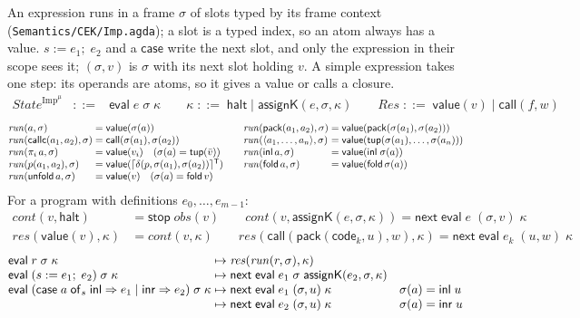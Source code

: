 \documentclass[10pt]{article}
\theoremstyle{acmplain}
\newcommand{\key}[1]{\mathsf{#1}}
\newcommand{\inl}{\key{inl}\,}
\newcommand{\tuple}[1]{\langle #1 \rangle}
\newcommand{\prj}[1]{\pi_{#1}\,}
\newcommand{\prim}[3]{#1(#2, #3)}
\newcommand{\nxt}{\key{next}\;}
\newcommand{\stp}{\key{stop}\;}
\newcommand{\obs}{\mathit{obs}}
\newcommand{\tupV}[1]{\key{tup}(#1)}
\newcommand{\codeV}[1]{\key{code}_{#1}}
\newcommand{\inlV}{\key{inl}\;}
\newcommand{\inrV}{\key{inr}\;}
\newcommand{\Kf}[2]{\key{#1}(#2)}
\newcommand{\halt}{\key{halt}}
\newcommand{\assign}[3]{#1 \mathrel{:=} #2;\; #3}
\newcommand{\Casei}[4]{\key{case}\;#1\;\key{of}_{#2}\;\key{inl} \Rightarrow #3 \mid \key{inr} \Rightarrow #4}
\newcommand{\evi}[3]{\key{eval}\;#1\;#2\;#3}
\newcommand{\Tpack}[2]{\key{pack}(#1, #2)}     %
\newcommand{\Tcallc}[2]{\key{callc}(#1, #2)}   %
\newcommand{\Tres}[1]{\lceil #1 \rceil^{\mathsf{T}}}      %
\newcommand{\Ml}[1]{\textrm{#1}^{\mu}}                  %
\newcommand{\Mfold}{\key{fold}\,}
\newcommand{\Munfold}{\key{unfold}\,}
\begin{document}
An expression runs in a frame $\sigma$ of slots typed by its frame context
(\texttt{Semantics/CEK/Imp.agda}); a slot is a typed index, so an atom
always has a value. $\assign{s}{e_1}{e_2}$ and a $\key{case}$ write the
next slot, and only the expression in their scope sees it; $(\sigma, v)$ is
$\sigma$ with its next slot holding $v$. A simple expression takes one step:
its operands are atoms, so it gives a value or calls a closure.
\[
\begin{array}{rcl}
  \mathit{State}^{\Ml{Imp}} &::=& \evi{e}{\sigma}{\kappa} \qquad
  \kappa \;::=\; \halt \mid \Kf{assignK}{e, \sigma, \kappa} \qquad
  \mathit{Res} \;::=\; \key{value}(v) \mid \key{call}(f, w)
\end{array}
\]
\[
\begin{array}{@{}l@{\;=\;}l@{\qquad}l@{\;=\;}l@{}}
  \mathit{run}(a, \sigma) & \key{value}(\sigma(a)) &
  \mathit{run}(\Tpack{a_1}{a_2}, \sigma) & \key{value}(\Tpack{\sigma(a_1)}{\sigma(a_2)}) \\
  \mathit{run}(\Tcallc{a_1}{a_2}, \sigma) & \key{call}(\sigma(a_1), \sigma(a_2)) &
  \mathit{run}(\tuple{a_1, \ldots, a_n}, \sigma) & \key{value}(\tupV{\sigma(a_1), \ldots, \sigma(a_n)}) \\
  \mathit{run}(\prj{i} a, \sigma) & \key{value}(v_i) \quad (\sigma(a) = \tupV{\bar{v}}) &
  \mathit{run}(\inl a, \sigma) & \key{value}(\inlV \sigma(a)) \\
  \mathit{run}(\prim{p}{a_1}{a_2}, \sigma) & \key{value}(\Tres{\delta(p, \sigma(a_1), \sigma(a_2))}) &
  \mathit{run}(\Mfold a, \sigma) & \key{value}(\Mfold \sigma(a)) \\
  \mathit{run}(\Munfold a, \sigma) & \key{value}(v) \quad (\sigma(a) = \Mfold v)
\end{array}
\]
For a program with definitions $e_0, \ldots, e_{m-1}$:
\begin{align*}
  \mathit{cont}(v, \halt) &= \stp \obs(v) \qquad
  \mathit{cont}(v, \Kf{assignK}{e, \sigma, \kappa}) = \nxt \evi{e}{(\sigma, v)}{\kappa} \\
  \mathit{res}(\key{value}(v), \kappa) &= \mathit{cont}(v, \kappa) \qquad
  \mathit{res}(\key{call}(\Tpack{\codeV{k}}{u}, w), \kappa) = \nxt \evi{e_k}{(u, w)}{\kappa}
\end{align*}
\[
\begin{array}{@{}l@{\;\mapsto\;}l@{\quad}l@{}}
  \evi{r}{\sigma}{\kappa} & \mathit{res}(\mathit{run}(r, \sigma), \kappa) \\
  \evi{(\assign{s}{e_1}{e_2})}{\sigma}{\kappa} & \nxt \evi{e_1}{\sigma}{\Kf{assignK}{e_2, \sigma, \kappa}} \\
  \evi{(\Casei{a}{s}{e_1}{e_2})}{\sigma}{\kappa} & \nxt \evi{e_1}{(\sigma, u)}{\kappa} & \sigma(a) = \inlV u \\
  & \nxt \evi{e_2}{(\sigma, u)}{\kappa} & \sigma(a) = \inrV u
\end{array}
\]
\end{document}
